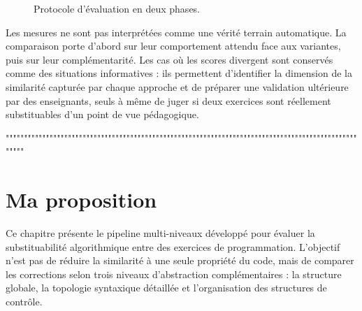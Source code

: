 {\begin{figure}[htbp]
{%
}
\caption{Protocole d'évaluation en deux phases.}
\label{fig:protocole}
\end{figure}

Les mesures ne sont pas interprétées comme une vérité terrain automatique. La
comparaison porte d'abord sur leur comportement attendu face aux variantes,
puis sur leur complémentarité. Les cas où les scores divergent sont conservés
comme des situations informatives : ils permettent d'identifier la dimension
de la similarité capturée par chaque approche et de préparer une validation
ultérieure par des enseignants, seuls à même de juger si deux exercices sont
réellement substituables d'un point de vue pédagogique.


"""""""""""""""""""""""""""""""""""""""""""""""""""""""""""""""""""""""""""""""""""""""""""""""""""""



\chapter{Ma proposition}
\label{chap:proposition}

Ce chapitre présente le pipeline multi-niveaux développé pour évaluer la
substituabilité algorithmique entre des exercices de programmation.
L'objectif n'est pas de réduire la similarité à une seule propriété du code,
mais de comparer les corrections selon trois niveaux d'abstraction
complémentaires : la structure globale, la topologie syntaxique détaillée et
l'organisation des structures de contrôle.

}
